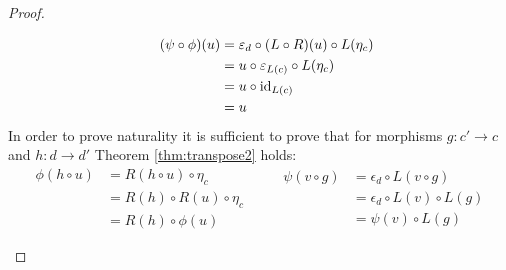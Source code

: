 \begin{theorem}
\begin{proof}
\begin{description}
\[        \quad
        \begin{aligned}
          (\psi\circ \phi)(u)
          &= \varepsilon_d \circ (L\circ R)(u) \circ L(\eta_c)\\
          &= u \circ \varepsilon_{L(c)} \circ L(\eta_c)\\
          &= u \circ \mathrm{id}_{L(c)}\\
          &= u
        \end{aligned}
        \] In order to prove naturality it is sufficient to prove that for
        morphisms $g:c'\to c$ and $h:d\to d'$ Theorem \ref{thm:transpose2}
        holds:
        \[
          \begin{aligned}
            \phi(h\circ u)
              &= R(h\circ u) \circ \eta_c\\
              &= R(h) \circ R(u) \circ \eta_c\\
              &= R(h) \circ \phi(u)
          \end{aligned}
          \qquad
          \begin{aligned}
            \psi(v\circ g)
              &= \epsilon_d \circ L(v\circ g)\\
              &= \epsilon_d \circ L(v) \circ L(g)\\
              &= \psi(v) \circ L(g)
          \end{aligned}
        \]
    \end{description}
  \end{proof}
\end{theorem}
